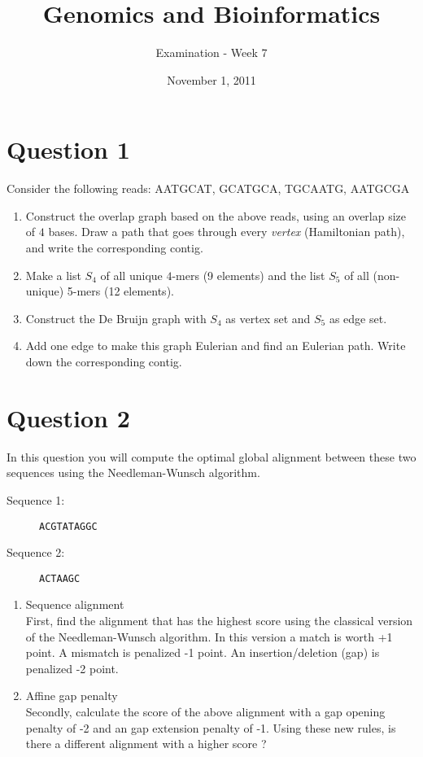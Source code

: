 \documentclass[a4paper,11pt]{article}
\title{Genomics and Bioinformatics}
\date{November 1, 2011}
\author{Examination - Week 7}
\begin{document}
\maketitle

\section*{Question 1}

Consider the following reads:
AATGCAT, GCATGCA, TGCAATG, AATGCGA

\begin{enumerate}
\item Construct the overlap graph based on the above reads, using an
  overlap size of $4$ bases.
  Draw a path that goes
  through every \emph{vertex} (Hamiltonian path), and write the
  corresponding contig. 
\item Make a list $S_4$ of all unique $4$-mers (9 elements) and the
  list $S_5$ of all (non-unique) 5-mers (12 elements). 
\item Construct the De Bruijn graph with $S_4$ as vertex set and
  $S_5$ as edge set.
\item Add one edge to make this graph Eulerian and find an Eulerian path.
  Write down the corresponding contig. 
\end{enumerate}

\section*{Question 2}
In this question you will compute the optimal global alignment between
these two sequences using the Needleman-Wunsch algorithm. 

\begin{description}
\item[Sequence 1:] \texttt{ACGTATAGGC}
\item[Sequence 2:] \texttt{ACTAAGC}
\end{description}

\begin{enumerate}
\item Sequence alignment\\
First, find the alignment that has the highest score using the
classical version of the Needleman-Wunsch algorithm. In this version a
match is worth +1 point. A mismatch is penalized -1 point. An
insertion/deletion (gap) is penalized -2 point. 
\item Affine gap penalty\\
Secondly, calculate the score of the above alignment with a gap
opening penalty of -2 and an gap extension penalty of -1. Using these
new rules, is there a different alignment with a higher score ?
\end{enumerate}
\end{document}
